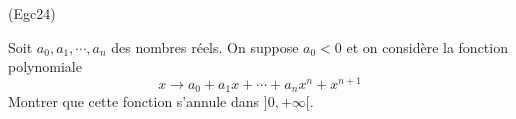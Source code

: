\begin{tiny}(Egc24)\end{tiny} Soit $a_0, a_1,\cdots, a_n$ des nombres réels. On suppose $a_0<0$ et on considère la fonction polynomiale
\begin{displaymath}
 x \rightarrow a_0 + a_1x + \cdots + a_n x^n + x^{n+1}
\end{displaymath}
Montrer que cette fonction s'annule dans $]0 , +\infty[$.